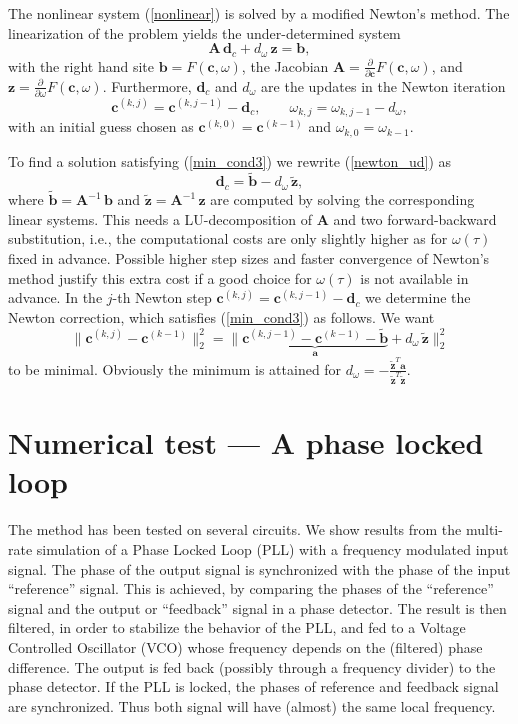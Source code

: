 \documentclass{siamltex}
\begin{document}
The nonlinear system (\ref{nonlinear}) is solved by a modified Newton's method. 
The linearization of the problem yields the under-determined system
\begin{equation}\label{newton_ud}
\bm{A\,d}_c+d_\omega\,\bm{z} =\bm{b},
\end{equation}
with the right hand site 
$\bm{b}=F(\bm{c},\omega)$, the Jacobian $\bm{A}= {{{\frac{\partial}{\partial \bm{c}}}}} F(\bm{c},\omega)$, and 
$\bm{z} = {{{\frac{\partial}{\partial \omega}}}} F(\bm{c},\omega)$. Furthermore, $\bm{d}_c$ and $d_\omega$ are the updates
in the Newton iteration
$$
\bm{c}^{(k,j)}=\bm{c}^{(k,j-1)}-\bm{d}_c,\qquad \omega_{k,j}=\omega_{k,j-1}-d_\omega,
$$
{{{with an initial guess chosen as $\bm{c}^{(k,0)}=\bm{c}^{(k-1)}$ and $\omega_{k,0}=\omega_{k-1}$.}}}

To find a solution satisfying (\ref{min_cond3}) we rewrite (\ref{newton_ud}) as
$$
\bm{d}_c=\tilde{\bm{b}} - d_\omega\,\tilde{\bm{z}},
$$
where $\tilde{\bm{b}}=\bm{A}^{-1}\,\bm{b}$ and $\tilde{\bm{z}}=\bm{A}^{-1}\,\bm{z}$ are computed 
by solving the corresponding linear systems. This needs a LU-decomposition of $\bm{A}$ and two 
forward-backward substitution, i.e., the computational costs are only slightly higher as for 
$\omega(\tau)$ fixed in advance. Possible higher step sizes and faster convergence of Newton's method
justify this extra cost if a good choice for $\omega(\tau)$ is not available in advance.
In the $j$-th Newton step $\bm{c}^{(k,j)} = \bm{c}^{(k,j-1)}-\bm{d}_c$ we determine the Newton 
correction, which satisfies (\ref{min_cond3})
as follows. We want
$$
\|\bm{c}^{(k,j)}-\bm{c}^{(k-1)}\big\|^2_2
=\|\underbrace{\bm{c}^{(k,j-1)}-\bm{c}^{(k-1)}-\tilde{\bm{b}}}_{\bm{a}} 
   + d_\omega\,\tilde{\bm{z}}\|^2_2
$$
to be minimal.
Obviously the minimum is attained for
$
d_\omega = -\frac{\tilde{\bm{z}}^T\bm{a}}{\tilde{\bm{z}}^T\tilde{\bm{z}}}.
$

\section{Numerical test --- A phase locked loop\label{NUM_TEST}}

{{{The method has been tested on several circuits. 
We show results from the
multi-rate simulation of a Phase Locked Loop (PLL) with a frequency modulated input signal.
The phase of the output signal is synchronized  with the phase of the input ``reference'' signal.}}}
This is achieved, by comparing the phases of the ``reference'' signal and the
output or ``feedback'' signal in a phase detector. The result is then filtered,
in order to stabilize the behavior of the PLL, and fed to a Voltage Controlled Oscillator (VCO)
whose frequency depends on the (filtered) phase difference. The output is fed back
(possibly through a frequency divider) to the phase detector. If the PLL is locked, the phases
of reference and feedback signal are synchronized. Thus both signal will have (almost) 
the same local frequency.
\end{document}
